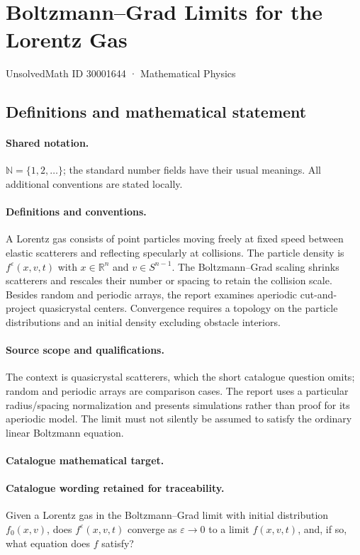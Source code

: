 \documentclass[11pt]{article}
\begin{document}
\setcounter{section}{30001643}
\section{Boltzmann–Grad Limits for the Lorentz Gas}\label{30001644}
{\small UnsolvedMath ID 30001644 · Mathematical Physics}
\subsection{Definitions and mathematical statement}

\paragraph{Shared notation.}$\mathbb N=\{1,2,\ldots\}$; the standard number fields have their usual meanings. All additional conventions are stated locally.


\paragraph{Definitions and conventions.} A Lorentz gas consists of point particles moving freely at fixed speed between elastic scatterers and reflecting specularly at collisions. The particle density is $f^\varepsilon(x,v,t)$ with $x\in\mathbb R^n$ and $v\in S^{n-1}$. The Boltzmann--Grad scaling shrinks scatterers and rescales their number or spacing to retain the collision scale. Besides random and periodic arrays, the report examines aperiodic cut-and-project quasicrystal centers. Convergence requires a topology on the particle distributions and an initial density excluding obstacle interiors.

\paragraph{Source scope and qualifications.} The context is quasicrystal scatterers, which the short catalogue question omits; random and periodic arrays are comparison cases. The report uses a particular radius/spacing normalization and presents simulations rather than proof for its aperiodic model. The limit must not silently be assumed to satisfy the ordinary linear Boltzmann equation.

\paragraph{Catalogue mathematical target.}
\paragraph{Catalogue wording retained for traceability.}
Given a Lorentz gas in the Boltzmann–Grad limit with initial distribution $f_0(x,v)$, does $f^\varepsilon(x,v,t)$ converge as $\varepsilon\to0$ to a limit $f(x,v,t)$, and, if so, what equation does $f$ satisfy?
\end{document}
